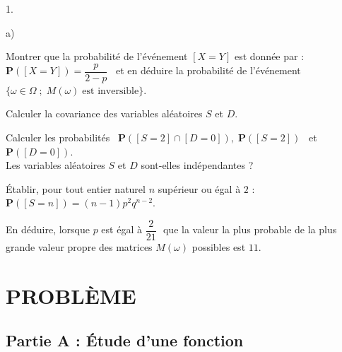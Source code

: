 \documentclass[11pt]{article}%
\begin{document}
\begin{noliste}{1.}
\begin{noliste}{a)}
 \setlength{\itemsep}{2mm}
\item Montrer que la probabilité de l'événement $[X = Y]$ est donnée
par :\ $\mathbf{P}([X = Y]) = \dfrac{p}{2-p}$ \ et en déduire la
probabilité de l'événement $\{\omega \in \Omega \;;\;M(\omega
)\;\text{est inversible}\}$.

\item Calculer la covariance des variables aléatoires $S$ et $D$.

\item Calculer les probabilités \ $\mathbf{P}([S = 2]\cap [D =
0]),\;\mathbf{P}([S = 2])$ \ et\ $\mathbf{P}([D = 0])$.\\
Les variables aléatoires $S$ et $D$ sont-elles indépendantes ?

\item Établir, pour tout entier naturel $n$ supérieur ou égal 
à $2$ : \ $\mathbf{P}([S = n]) = (n-1)p^{2}q^{n-2}$.

\item En déduire, lorsque $p$ est égal à $\dfrac{2}{21}$\,\ que
la valeur la plus probable de la plus grande valeur propre des matrices
$M(\omega )$ possibles est $11$.
\end{noliste}
\end{noliste}

\section*{PROBL\`{E}ME}

\subsection*{Partie A : Étude d'une fonction\protect\vspace{0.4cm}}

{\normalsize \label{P1} }
\end{document}
